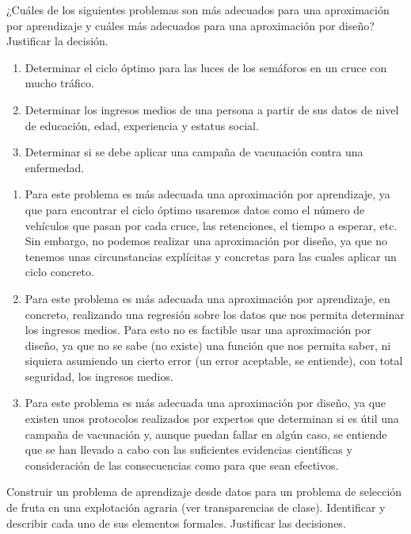 \documentclass[11pt,leqno]{article}
\theoremstyle{definition}
\begin{document}
\begin{cuestion}
¿Cuáles de los siguientes problemas son más adecuados para una aproximación por aprendizaje y cuáles más adecuados para una aproximación por diseño? Justificar la decisión.
\begin{enumerate}[a]
\item Determinar el ciclo óptimo para las luces de los semáforos en un cruce con mucho tráfico.
\item Determinar los ingresos medios de una persona a partir de sus datos de nivel de educación, edad, experiencia y estatus social.
\item Determinar si se debe aplicar una campaña de vacunación contra una enfermedad.
\end{enumerate}
\end{cuestion}

\begin{solucion} \textbf{ }
\begin{enumerate}[a]
\item Para este problema es más adecuada una aproximación por aprendizaje, ya que para encontrar el ciclo óptimo usaremos datos como el número de vehículos que pasan por cada cruce, las retenciones, el tiempo a esperar, etc. Sin embargo, no podemos realizar una aproximación por diseño, ya que no tenemos unas circunstancias explícitas y concretas para las cuales aplicar un ciclo concreto.
\item Para este problema es más adecuada una aproximación por aprendizaje,  en concreto, realizando una regresión sobre los datos que nos permita determinar los ingresos medios. Para esto no es factible usar una aproximación por diseño, ya que no se sabe (no existe) una función que nos permita saber, ni siquiera asumiendo un cierto error (un error aceptable, se entiende), con total seguridad, los ingresos medios.
\item Para este problema es más adecuada una aproximación por diseño, ya que existen unos protocolos realizados por expertos que determinan si es útil una campaña de vacunación y, aunque puedan fallar en algún caso, se entiende que se han llevado a cabo con las suficientes evidencias científicas y consideración de las consecuencias como para que sean efectivos.
\end{enumerate}
\end{solucion}

\begin{cuestion}
Construir un problema de aprendizaje desde datos para un problema de selección de fruta en una explotación agraria (ver transparencias de clase). Identificar y describir cada uno de sus elementos formales. Justificar las decisiones.
\end{cuestion}
\end{document}
